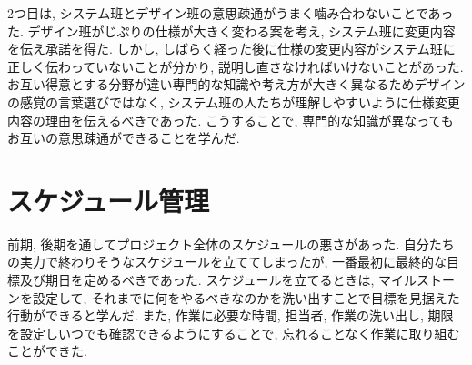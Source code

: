2つ目は, システム班とデザイン班の意思疎通がうまく噛み合わないことであった.
デザイン班がじぷりの仕様が大きく変わる案を考え, システム班に変更内容を伝え承諾を得た. しかし, しばらく経った後に仕様の変更内容がシステム班に正しく伝わっていないことが分かり,
説明し直さなければいけないことがあった. お互い得意とする分野が違い専門的な知識や考え方が大きく異なるためデザインの感覚の言葉選びではなく,
システム班の人たちが理解しやすいように仕様変更内容の理由を伝えるべきであった. こうすることで, 専門的な知識が異なってもお互いの意思疎通ができることを学んだ.

\section{スケジュール管理}
前期, 後期を通してプロジェクト全体のスケジュールの悪さがあった. 自分たちの実力で終わりそうなスケジュールを立ててしまったが, 一番最初に最終的な目標及び期日を定めるべきであった.
スケジュールを立てるときは, マイルストーンを設定して, それまでに何をやるべきなのかを洗い出すことで目標を見据えた行動ができると学んだ.
また, 作業に必要な時間, 担当者, 作業の洗い出し, 期限を設定しいつでも確認できるようにすることで, 忘れることなく作業に取り組むことができた.

